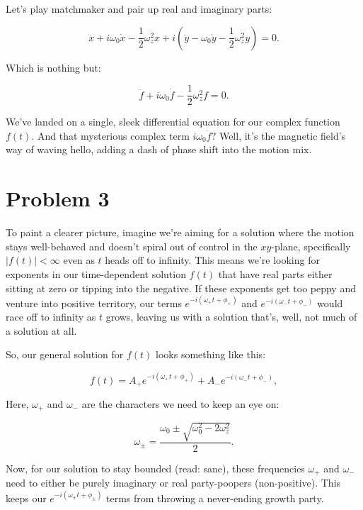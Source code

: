 \documentclass{article}
\begin{document}
Let's play matchmaker and pair up real and imaginary parts:

\begin{equation}
\ddot{x} + i\omega_0 \dot{x} - \frac{1}{2}\omega_z^2 x + i(\ddot{y} - \omega_0 \dot{y} - \frac{1}{2}\omega_z^2 y) = 0.
\end{equation}

Which is nothing but:

\begin{equation}
\ddot{f} + i\omega_0 \dot{f} - \frac{1}{2}\omega_z^2 f = 0.
\end{equation}

We've landed on a single, sleek differential equation for our complex function \(f(t)\). And that mysterious complex term \(i\omega_0 \dot{f}\)? Well, it's the magnetic field's way of waving hello, adding a dash of phase shift into the motion mix.



\section{Problem 3}

To paint a clearer picture, imagine we're aiming for a solution where the motion stays well-behaved and doesn't spiral out of control in the \(xy\)-plane, specifically \(|f(t)| < \infty\) even as \(t\) heads off to infinity. This means we're looking for exponents in our time-dependent solution \(f(t)\) that have real parts either sitting at zero or tipping into the negative. If these exponents get too peppy and venture into positive territory, our terms \(e^{-i(\omega_+ t + \phi_+)}\) and \(e^{-i(\omega_- t + \phi_-)}\) would race off to infinity as \(t\) grows, leaving us with a solution that's, well, not much of a solution at all.

So, our general solution for \(f(t)\) looks something like this:

\begin{equation}
f(t) = A_+ e^{-i(\omega_+ t + \phi_+)} + A_- e^{-i(\omega_- t + \phi_-)},
\end{equation}

Here, \(\omega_+\) and \(\omega_-\) are the characters we need to keep an eye on:

\begin{equation}
\omega_\pm = \frac{\omega_0 \pm \sqrt{\omega_0^2 - 2\omega_z^2}}{2}.
\end{equation}

Now, for our solution to stay bounded (read: sane), these frequencies \(\omega_+\) and \(\omega_-\) need to either be purely imaginary or real party-poopers (non-positive). This keeps our \(e^{-i(\omega_\pm t + \phi_\pm)}\) terms from throwing a never-ending growth party.
\end{document}
